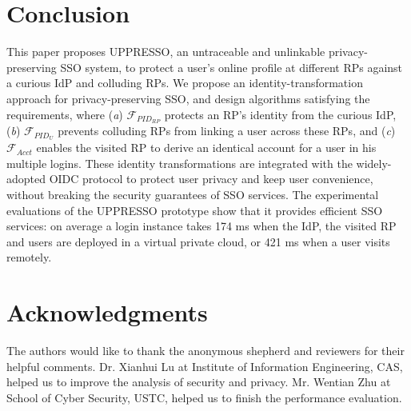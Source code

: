 \section{Conclusion}
\label{sec:conclusion}
This paper proposes UPPRESSO, an untraceable and unlinkable privacy-preserving SSO system,
 to protect a user's online profile at different RPs against a curious IdP and colluding RPs.
We propose an identity-transformation approach for privacy-preserving SSO,
 and design algorithms satisfying the requirements,
 where (\emph{a}) $\mathcal{F}_{PID_{RP}}$ protects an RP's identity from the curious IdP,
(\emph{b})  $\mathcal{F}_{PID_{U}}$ prevents colluding RPs from linking a user across these RPs,
 and (\emph{c}) $\mathcal{F}_{Acct}$ enables the visited RP to derive an identical account for a user in his multiple logins.
These identity transformations are integrated with the widely-adopted OIDC protocol
    to protect user privacy and keep user convenience,
    without breaking the security guarantees of SSO services.
The experimental evaluations of the UPPRESSO prototype show
 that it provides efficient SSO services:
  on average a login instance takes 174 ms when the IdP, the visited RP and users are deployed in a virtual private cloud, or 421 ms when a user visits remotely.

\section*{Acknowledgments}
The authors would like to thank the anonymous shepherd and reviewers for their helpful comments.
Dr. Xianhui Lu at Institute of Information Engineering, CAS,
    helped us to improve the analysis of security and privacy.
Mr. Wentian Zhu at School of Cyber Security, USTC,
        helped us to finish the performance evaluation.